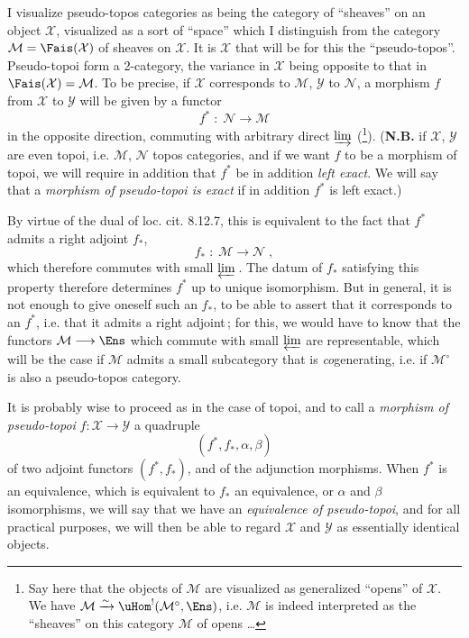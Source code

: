 I visualize pseudo-topos categories as being the category of ``sheaves'' on an object $\mathcal{X}$, visualized as a sort of ``space'' which I distinguish from the category $\mathcal{M}=\Fais(\mathcal{X})$ of sheaves on $\mathcal{X}$. It is $\mathcal{X}$ that will be for this the ``pseudo-topos''. Pseudo-topoi form a 2-category, the variance in $\mathcal{X}$ being opposite to that in $\Fais(\mathcal{X})=\mathcal{M}$. To be precise, if $\mathcal{X}$ corresponds to $\mathcal{M}$, $\mathcal{Y}$ to $\mathcal{N}$, a morphism $f$ from $\mathcal{X}$ to $\mathcal{Y}$ will be given by a functor
\[
f^* \;:\; \mathcal{N} \longrightarrow \mathcal{M}
\tag*{(4.1.1)}
\]
in the opposite direction, commuting with arbitrary direct $\varinjlim$ (\footnote{Say here that the objects of $\mathcal{M}$ are visualized as generalized ``opens'' of $\mathcal{X}$. We have $\mathcal{M}\xrightarrow{\sim}\uHom^!(\mathcal{M}^\circ,\Ens)$, i.e. $\mathcal{M}$ is indeed interpreted as the ``sheaves'' on this category $\mathcal{M}$ of opens \ldots}). (\textbf{N.B.} if $\mathcal{X}$, $\mathcal{Y}$ are even topoi, i.e. $\mathcal{M}$, $\mathcal{N}$ topos categories, and if we want $f$ to be a morphism of topoi, we will require in addition that $f^*$ be in addition \textit{left exact}. We will say that a \textit{morphism of pseudo-topoi is exact} if in addition $f^*$ is left exact.)

By virtue of the dual of loc. cit. 8.12.7, this is equivalent to the fact that $f^*$ admits a right adjoint $f_*$,
\[
f_* \;:\; \mathcal{M} \longrightarrow \mathcal{N}\;,
\tag*{(4.1.2)}
\]
which therefore commutes with small $\varprojlim$\,. The datum of $f_*$ satisfying this property therefore determines $f^*$ up to unique isomorphism. But in general, it is not enough to give oneself such an $f_*$, to be able to assert that it corresponds to an $f^*$, i.e. that it admits a right adjoint\,; for this, we would have to know that the functors $\mathcal{M}\longrightarrow\Ens$ which commute with small $\varprojlim$ are representable, which will be the case if $\mathcal{M}$ admits a small subcategory that is \textit{co}generating, i.e. if $\mathcal{M}^\circ$ is also a pseudo-topos category. %

\newpage


It is probably wise to proceed as in the case of topoi, and to call a \textit{morphism of pseudo-topoi} $f:\mathcal{X}\longrightarrow\mathcal{Y}$ a quadruple
\[
(f^*,f_*,\alpha,\beta)
\tag*{(4.1.3)}
\]
of two adjoint functors $(f^*,f_*)$, and of the adjunction morphisms. When $f^*$ is an equivalence, which is equivalent to $f_*$ an equivalence, or $\alpha$ and $\beta$ isomorphisms, we will say that we have an \textit{equivalence of pseudo-topoi}, and for all practical purposes, we will then be able to regard $\mathcal{X}$ and $\mathcal{Y}$ as essentially identical objects.

